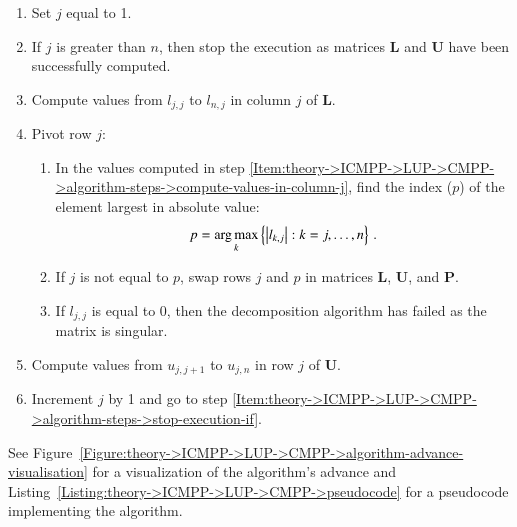 \begin{enumerate}
	\item Set $j$ equal to 1.
	\item \label{Item:theory->ICMPP->LUP->CMPP->algorithm-steps->stop-execution-if}
		If $j$ is greater than $n$, then stop the execution as matrices $\mathbf{L}$ and $\mathbf{U}$ have been successfully computed.
	\item \label{Item:theory->ICMPP->LUP->CMPP->algorithm-steps->compute-values-in-column-j}
		Compute values from $l_{j,j}$ to $l_{n,j}$ in column $j$ of $\mathbf{L}$.
	\item \label{Item:theory->ICMPP->LUP->CMPP->algorithm-steps->pivot-row-j}
		Pivot row $j$:
	\begin{enumerate}
		\item In the values computed in step \ref{Item:theory->ICMPP->LUP->CMPP->algorithm-steps->compute-values-in-column-j}, find the index ($p$) of the element largest in absolute value:
		\begin{equation}
			p = \operatorname*{arg\,max}_k \left\{ \left| l_{k, j} \right|: k=j,\dots, n \right\} \,.
		\end{equation}
		\item If $j$ is not equal to $p$, swap rows $j$ and $p$ in matrices $\mathbf{L}$, $\mathbf{U}$, and $\mathbf{P}$.
		\item If $l_{j,j}$ is equal to 0, then the decomposition algorithm has failed as the matrix is singular.
	\end{enumerate}
	\item Compute values from $u_{j,j+1}$ to $u_{j,n}$ in row $j$ of $\mathbf{U}$.
	\item Increment $j$ by 1 and go to step \ref{Item:theory->ICMPP->LUP->CMPP->algorithm-steps->stop-execution-if}.
\end{enumerate}

See Figure~\ref{Figure:theory->ICMPP->LUP->CMPP->algorithm-advance-visualisation} for a visualization of the algorithm's advance  and Listing~\ref{Listing:theory->ICMPP->LUP->CMPP->pseudocode} for a pseudocode implementing the algorithm.

